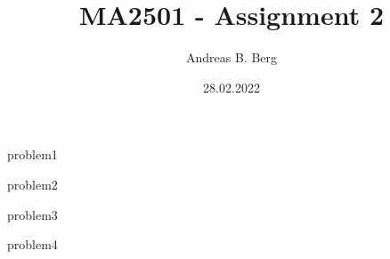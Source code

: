\documentclass{article}
\begin{document}
\mainmatter

\title{MA2501 - Assignment 2}
\author{Andreas B. Berg}
\date{28.02.2022}
\maketitle
\thispagestyle{fancy}

{problem1}

\pagebreak
{problem2}

\pagebreak
{problem3}

\pagebreak
{problem4}



\end{document}
